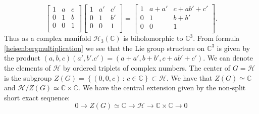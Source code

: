 \documentclass[12pt,twoside,a4paper]{report}
\newcommand{\co}{\ensuremath{\mathbb C }}
\newcommand{\He}{\ensuremath{\mathscr{ H }}}
\begin{document}
\begin{equation}\label{heisenbergmultiplication}{\begin{bmatrix}1&a&c\\0&1&b\\0&0&1\\\end{bmatrix}}{\begin{bmatrix}1&a'&c'\\0&1&b'\\0&0&1\\\end{bmatrix}}={\begin{bmatrix}1&a+a'&c+ab'+c'\\0&1&b+b'\\0&0&1\\\end{bmatrix}}.\end{equation}
Thus as a complex manifold $\mathcal{H}_3(\co)$ is biholomorphic to $\co^3$. From formula
\ref{heisenbergmultiplication} we see that the Lie group structure on $\co^3$ is given by the product
$(a,b,c)(a',b'.c')=(a+a',b+b', c+ab'+c')$. We can denote  the elements of $\He$ by  ordered triplets of complex numbers.  The center of $G=\He$ is the subgroup $Z(G)=\left\{(0,0,c)\,:\, c\in\co\right\}\subset\He$. We have that $Z(G)\simeq\co$ and $\He/Z(G)\simeq{\co\times\co}$. We have the central extension given by the non-split short exact sequence:
\begin{equation}\label{centerexseq}
0\longrightarrow{Z(G)}\simeq\co\longrightarrow\He\longrightarrow\co\times\co\longrightarrow0
\end{equation}
 
\end{document}
